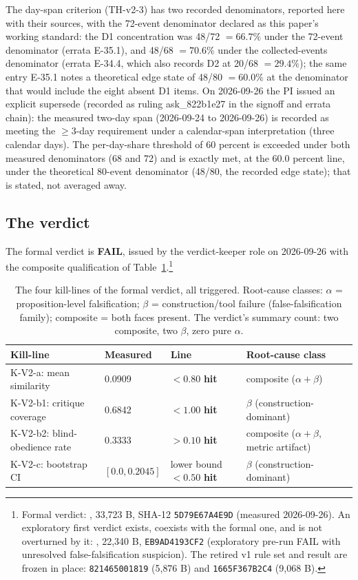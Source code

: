 \documentclass[11pt]{article}
\newcommand{\sha}[1]{\texttt{#1}}
\newcommand{\hit}{\textbf{hit}}
\begin{document}
The day-span criterion (TH-v2-3) has two recorded denominators, reported here with their sources, with the 72-event denominator declared as this paper's working standard: the D1 concentration was 48/72 $= 66.7\%$ under the 72-event denominator (errata E-35.1), and 48/68 $= 70.6\%$ under the collected-events denominator (errata E-34.4, which also records D2 at 20/68 $= 29.4\%$); the same entry E-35.1 notes a theoretical edge state of 48/80 $= 60.0\%$ at the denominator that would include the eight absent D1 items. On 2026-09-26 the PI issued an explicit supersede (recorded as ruling ask\_822b1e27 in the signoff and errata chain): the measured two-day span (2026-09-24 to 2026-09-26) is recorded as meeting the $\geq 3$-day requirement under a calendar-span interpretation (three calendar days). The per-day-share threshold of 60 percent is exceeded under both measured denominators (68 and 72) and is exactly met, at the 60.0 percent line, under the theoretical 80-event denominator (48/80, the recorded edge state); that is stated, not averaged away.

\subsection{The verdict}

The formal verdict is \textbf{FAIL}, issued by the verdict-keeper role on 2026-09-26 with the composite qualification of Table~\ref{tab:killlines}.\footnote{Formal verdict: , 33{,}723 B, SHA-12 \sha{5D79E67A4E9D} (measured 2026-09-26). An exploratory first verdict exists, coexists with the formal one, and is not overturned by it: , 22{,}340 B, \sha{EB9AD4193CF2} (exploratory pre-run FAIL with unresolved false-falsification suspicion). The retired v1 rule set and result are frozen in place: \sha{821465001819} (5{,}876 B) and \sha{1665F367B2C4} (9{,}068 B).}

\begin{table}[htbp]
\centering
\begin{tabular}{llll}
\toprule
Kill-line & Measured & Line & Root-cause class \\
\midrule
K-V2-a: mean similarity & 0.0909 & $< 0.80$ \hit & composite ($\alpha + \beta$) \\
K-V2-b1: critique coverage & 0.6842 & $< 1.00$ \hit & $\beta$ (construction-dominant) \\
K-V2-b2: blind-obedience rate & 0.3333 & $> 0.10$ \hit & composite ($\alpha + \beta$, metric artifact) \\
K-V2-c: bootstrap CI & $[0.0, 0.2045]$ & lower bound $< 0.50$ \hit & $\beta$ (construction-dominant) \\
\bottomrule
\end{tabular}
\caption{The four kill-lines of the formal verdict, all triggered. Root-cause classes: $\alpha$ = proposition-level falsification; $\beta$ = construction/tool failure (false-falsification family); composite = both faces present. The verdict's summary count: two composite, two $\beta$, zero pure $\alpha$.}
\label{tab:killlines}
\end{table}
\end{document}
